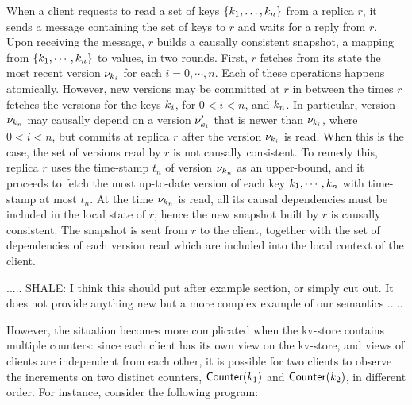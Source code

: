 When a client requests to read a set of keys \( \{k_1, \dots,
k_n\} \) from a  replica $r$, it sends a message 
containing the set of keys to $r$ and waits for a reply from $r$. Upon receiving the message, $r$ builds a causally consistent snapshot, \ie
a mapping from $\{k_{1},\cdots, k_{n}\}$ to values, in two rounds. 
First, $r$ fetches from its state 
the most recent version \( \nu_{k_i} \) for each $i
{=} 0,\cdots,n$. Each of these operations happens atomically. However, 
new versions may be committed at $r$ in between the times $r$ fetches the versions for the keys 
$k_{i}$, for $0 < i < n$,  and $k_{n}$. In particular, version $\nu_{k_{n}}$ may causally depend
on a version $\nu'_{k_{i}}$ that is newer than $\nu_{k_{i}}$,  where $0 < i < n$, but commits at replica $r$ 
after the version $\nu_{k_{i}}$ is read. When this is the case, the set of versions read by $r$ is not causally consistent. 
To remedy this, replica $r$ uses the time-stamp $t_{n}$ of version $\nu_{k_{n}}$ as an upper-bound, 
and it proceeds to fetch the most up-to-date version of each key $k_{1}, \cdots, k_{n}$ with time-stamp 
at most $t_{n}$. At the time $\nu_{k_{n}}$ is read,  all its causal dependencies must be included in the local 
state of $r$, hence the new snapshot built by $r$ is causally consistent. The snapshot is sent  from $r$ 
to the client, together with the set of dependencies of each version
read which are 
included into the local context of the client.


..... SHALE: I think this should put after example section, or simply cut out.
It does not provide anything new but a more complex example of our semantics .....


However, the situation becomes more complicated when the kv-store contains multiple counters:  
since each client has its own view on the kv-store, and views of clients are independent from each other, it is possible for two 
clients to observe the increments on two distinct counters, $\mathsf{Counter}(k_1)$ and $\mathsf{Counter}(k_2)$, in different order. 
For instance, consider the following program:

